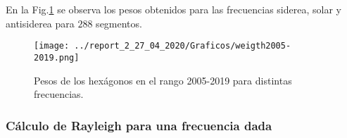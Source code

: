       En la Fig.\ref{fig:pesos_ejemplo} se observa los pesos obtenidos para las frecuencias siderea, solar y antisiderea para $288$ segmentos.

        \begin{figure}[H]
          \centering
              \texttt{[image: ../report\_2\_27\_04\_2020/Graficos/weigth2005-2019.png]}
              \caption{Pesos de los hexágonos en el rango 2005-2019 para distintas frecuencias.}
              \label{fig:pesos_ejemplo}
        \end{figure}

  \subsubsection{Cálculo de Rayleigh para una frecuencia dada}

